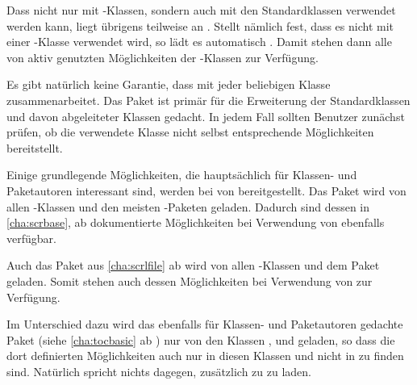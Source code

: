 Dass \hyperref[cha:scrlttr2]{}%
 nicht nur mit
\KOMAScript-Klassen, sondern auch mit den Standardklassen verwendet werden
kann, liegt übrigens teilweise an . Stellt
\hyperref[cha:scrlttr2]{} nämlich fest, dass es nicht mit
einer \KOMAScript-Klasse verwendet wird, so lädt es automatisch
. Damit stehen dann alle von
\hyperref[cha:scrlttr2]{} aktiv genutzten Möglichkeiten der
\KOMAScript-Klassen zur Verfügung.

Es gibt natürlich keine Garantie, dass  mit jeder
beliebigen Klasse zusammenarbeitet. Das Paket ist primär für die Erweiterung
der Standardklassen und davon abgeleiteter Klassen gedacht. In jedem Fall
sollten Benutzer zunächst prüfen, ob die verwendete Klasse nicht selbst
entsprechende Möglichkeiten bereitstellt.

\iffalse%
Neben den in diesem Kapitel beschriebenen Möglichkeiten gibt es einige
weitere, die hauptsächlich für Klassen- und Paketautoren gedacht sind. %
Diese sind in \autoref{cha:scrbase}, ab \autopageref{cha:scrbase} zu
finden. Das dort dokumentierte Paket
\hyperref[cha:scrbase]{\Package{scrbase}}%
\important{\hyperref[cha:scrbase]{\Package{scrbase}}}\IndexPackage{scrbase}
wird von allen \KOMAScript-Klassen und dem Paket \Package{scrextend}
verwendet.%
\else%
Einige grundlegende Möglichkeiten, die hauptsächlich für Klassen- und
Paketautoren interessant sind, werden bei \KOMAScript{} von
\hyperref[cha:scrbase]{}%
bereitgestellt. Das Paket wird von allen \KOMAScript-Klassen und den meisten
\KOMAScript-Paketen geladen. Dadurch sind dessen in \autoref{cha:scrbase}, ab
 dokumentierte Möglichkeiten bei Verwendung von
 ebenfalls verfügbar.%
\fi

Auch das Paket \hyperref[cha:scrlfile]{}%
aus \autoref{cha:scrlfile} ab  wird von allen
\KOMAScript-Klassen und dem Paket  geladen.  Somit stehen
auch dessen Möglichkeiten bei Verwendung von  zur
Verfügung.

\iftrue %
Im Unterschied dazu wird das ebenfalls für Klassen- und Paketautoren gedachte
Paket \hyperref[cha:tocbasic]{}%
 (siehe
\autoref{cha:tocbasic} ab ) nur von den Klassen
,  und  geladen, so dass die
dort definierten Möglichkeiten auch nur in diesen Klassen und nicht in
 zu finden sind. Natürlich spricht nichts dagegen,
\hyperref[cha:tocbasic]{} zusätzlich zu
 zu laden.%
\fi

